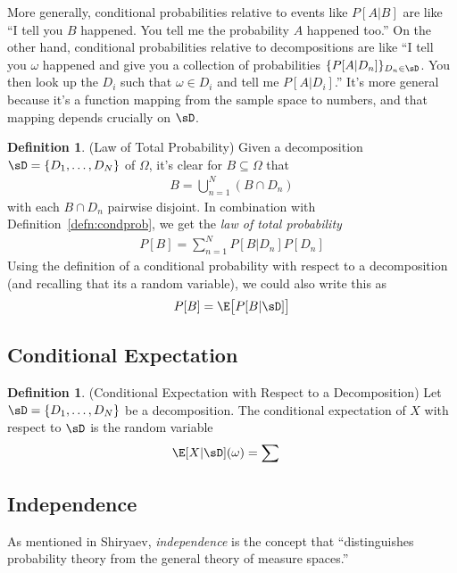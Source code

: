 \documentclass[12pt]{article}
\theoremstyle{plain}
\theoremstyle{definition}
\newtheorem{defn}[thm]{Definition}
\theoremstyle{remark}
\newcommand{\sumnN}{\sum^N_{n=1}}
\newcommand{\nN}{_{n=1}^N}
\begin{document}
More generally, conditional probabilities relative to events like
$P[A|B]$ are like ``I tell you $B$ happened. You tell me
the probability $A$ happened too.'' On the other hand, conditional
probabilities relative to decompositions are like ``I tell you $\omega$
happened and give you a collection of probabilities
$\{P[A|D_n]\}_{D_n\in\sD}$. You then look up the $D_i$ such that
$\omega\in D_i$ and tell me $P[A|D_i]$.'' It's more general because it's
a function mapping from the sample space to numbers, and that mapping
depends crucially on $\sD$.

\begin{defn}(Law of Total Probability)
Given a decomposition $\sD=\{D_1,\ldots,D_N\}$ of $\Omega$,
it's clear for $B\subseteq\Omega$ that
\begin{align*}
  B = \bigcup\nN (B\cap D_n)
\end{align*}
with each $B\cap D_n$ pairwise disjoint. In combination with
Definition~\ref{defn:condprob}, we get the
\emph{law of total probability}
\begin{align*}
  P[B] = \sumnN P[B|D_n]P[D_n]
\end{align*}
Using the definition of a conditional probability with respect to a
decomposition (and recalling that its a random variable), we could also
write this as
\begin{align*}
  P[B] = \E\big[P[B|\sD]\big]
\end{align*}
\end{defn}


\subsection{Conditional Expectation}

\begin{defn}(Conditional Expectation with Respect to a Decomposition)
Let $\sD = \{D_1,\ldots,D_N\}$  be a decomposition. The conditional
expectation of $X$ with respect to $\sD$ is the random variable
\begin{align*}
  \E[X|\sD](\omega)
  &=
  \sum
\end{align*}
\end{defn}


\subsection{Independence}

As mentioned in Shiryaev, \emph{independence} is the concept that
``distinguishes probability theory from the general theory of measure
spaces.''
\end{document}
